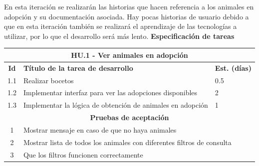 En esta iteración se realizarán las historias que hacen referencia a los animales en adopción y su documentación asociada. Hay pocas historias de usuario debido a que en esta iteración también se realizará el aprendizaje de las tecnologías a utilizar, por lo que el desarrollo será más lento.
\large{\textbf{Especificación de tareas}} \\


\begin{tabular}{|c|p{9.5cm}|p{1cm}|}
	\hline
	\multicolumn{3}{|c|}{\textbf{HU.1 - Ver animales en adopción}} \\
	\hline
	\textbf{Id} & \textbf{Título de la tarea de desarrollo} & \textbf{Est. (días)} \\
	\hline
	1.1 & Realizar bocetos & 0.5 \\ \hline
	1.2 &  Implementar interfaz para ver las adopciones disponibles & 2 \\ \hline
	1.3 &  Implementar la lógica de obtención de animales en adopción & 1 \\ \hline
	\multicolumn{3}{|c|}{\textbf{Pruebas de aceptación}} \\ \hline
	1 & \multicolumn{2}{|l|}{Mostrar mensaje en caso de que no haya animales} \\ \hline
	2 & \multicolumn{2}{|l|}{Mostrar lista de todos los animales con diferentes filtros de consulta} \\ \hline
	3 & \multicolumn{2}{|l|}{Que los filtros funcionen correctamente} \\ \hline
	
\end{tabular} \\ \\

\label{sec:hu1}

